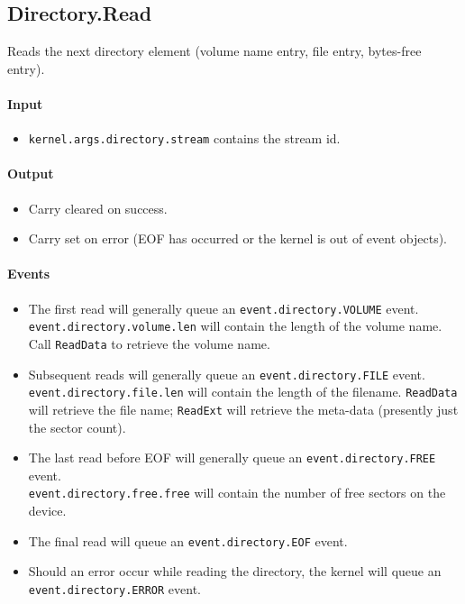 \subsection*{Directory.Read}
Reads the next directory element (volume name entry, file entry, bytes-free entry).

\paragraph{Input} 

\begin{itemize}
\item \verb+kernel.args.directory.stream+ contains the stream id.
\end{itemize}

\paragraph{Output}

\begin{itemize}
\item Carry cleared on success.
\item Carry set on error (EOF has occurred or the kernel is out of event objects).
\end{itemize}

\paragraph{Events}

\begin{itemize}
\item The first read will generally queue an \verb+event.directory.VOLUME+ event. \\ \verb+event.directory.volume.len+ will contain the length of the volume name. Call \verb+ReadData+ to retrieve the volume name.

\item Subsequent reads will generally queue an \verb+event.directory.FILE+ event. \\ \verb+event.directory.file.len+ will contain the length of the filename.  \verb+ReadData+ will retrieve the file name; \verb+ReadExt+ will retrieve the meta-data (presently just the sector count).

\item The last read before EOF will generally queue an \verb+event.directory.FREE+ event. \\ \verb+event.directory.free.free+ will contain the number of free sectors on the device.

\item The final read will queue an \verb+event.directory.EOF+ event.

\item Should an error occur while reading the directory, the kernel will queue an \\ \verb+event.directory.ERROR+ event.
\end{itemize}

